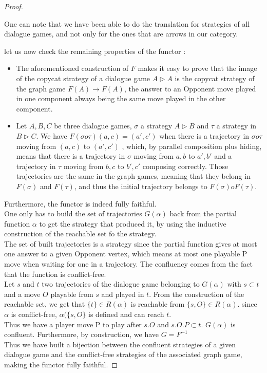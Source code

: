 \documentclass[a4paper,UKenglish]{lipics}
\begin{document}
\begin{proof}
\begin{itemize}
One can note that we have been able to do the translation for strategies of all dialogue games, and not only for the ones that are arrows in our category.\\

\end{itemize}
let us now check the remaining properties of the functor : 

\begin{itemize}
\item The aforementioned construction of $F$ makes it easy to prove that the image of the copycat strategy of a dialogue game $A\rhd A$ is the copycat strategy of the graph game $F(A)\rightarrow F(A)$, the answer to an Opponent move played in one component always being the same move played in the other component.\\

\item Let $A, B, C$ be three dialogue games, $\sigma$ a strategy $ A \rhd B$ and $\tau$ a strategy in $B \rhd C$. We have $F(\sigma o \tau)( a,c) = (a', c')$ when there is a trajectory in $\sigma o \tau$ moving from $(a,c)$ to $(a',c')$ , which, by parallel composition plus hiding, means that there is a trajectory in $\sigma$ moving from $a,b$ to $a',b'$ and a trajectory in $\tau$ moving from $b,c$ to $b',c'$ composing correctly. Those trajectories are the same in the graph games, meaning that they belong in $F(\sigma)$ and $F(\tau)$, and thus the initial trajectory belongs to $F(\sigma) o F(\tau)$. \\

\end{itemize}
Furthermore, the functor is indeed fully faithful.\\
 One only has to build the set of trajectories $G(\alpha)$ back from the partial function $\alpha$ to get the strategy that produced it, by using the inductive construction of the reachable set fo the strategy.\\
 The set of built trajectories is a strategy since the partial function gives at most one answer to a given Opponent vertex, which means at most one playable P  move when waiting for one in a trajectory. The confluency comes from the fact that the function is conflict-free. \\Let $s$ and $t$ two trajectories of the dialogue game belonging to $G(\alpha)$  with $s \subset t$ and a move $O$ playable from $s$ and played in $t$. From the construction of the reachable set, we get that $\{t\} \in R(\alpha)$ is reachable from $\{s,O\} \in R(\alpha)$. since $\alpha$ is conflict-free,  $\alpha(\{s,O\}$ is defined and can reach $t$. \\Thus we have a player move P to play after $s.O$ and  $s.O.P \subset t$. $G(\alpha)$ is confluent. Furthermore, by construction, we have $G=F^{-1}$  \\



Thus we have built a bijection between the confluent strategies of a given dialogue game and the conflict-free strategies of the associated graph game, making the functor fully faithful.


\end{proof}
\end{document}
